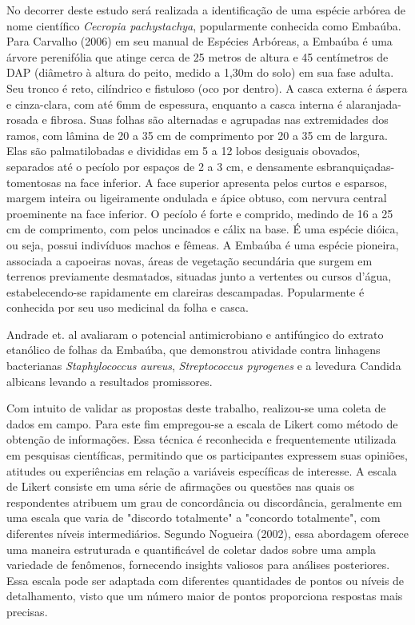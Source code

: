 No decorrer deste estudo será realizada a identificação de uma espécie arbórea de nome científico \textit{Cecropia pachystachya}, popularmente conhecida como Embaúba. Para Carvalho (2006) em seu manual de Espécies Arbóreas, a Embaúba é uma árvore perenifólia que atinge cerca de 25 metros de altura e 45 centímetros de DAP (diâmetro à altura do peito, medido a 1,30m do solo) em sua fase adulta. Seu tronco é reto, cilíndrico e fistuloso (oco por dentro). A casca externa é áspera e cinza-clara, com até 6mm de espessura, enquanto a casca interna é alaranjada-rosada e fibrosa. Suas folhas são alternadas e agrupadas nas extremidades dos ramos, com lâmina de 20 a 35 cm de comprimento por 20 a 35 cm de largura. Elas são palmatilobadas e divididas em 5 a 12 lobos desiguais obovados, separados até o pecíolo por espaços de 2 a 3 cm, e densamente esbranquiçadas-tomentosas na face inferior. A face superior apresenta pelos curtos e esparsos, margem inteira ou ligeiramente ondulada e ápice obtuso, com nervura central proeminente na face inferior. O pecíolo é forte e comprido, medindo de 16 a 25 cm de comprimento, com pelos uncinados e cálix na base. É uma espécie dióica, ou seja, possui indivíduos machos e fêmeas.\cite{carvalho2006embauba}
A Embaúba é uma espécie pioneira, associada a capoeiras novas, áreas de vegetação secundária que surgem em terrenos previamente desmatados, situadas junto a vertentes ou cursos d'água, estabelecendo-se rapidamente em clareiras descampadas. Popularmente é conhecida por seu uso medicinal da folha e casca. \cite{carvalho2006embauba}

Andrade et. al avaliaram o potencial antimicrobiano e antifúngico do extrato etanólico de folhas da Embaúba, que demonstrou atividade contra linhagens bacterianas \textit {Staphylococcus aureus}, \textit {Streptococcus pyrogenes} e a levedura Candida albicans levando a resultados promissores.\cite{de2021avaliaccao}

Com intuito de validar as propostas deste trabalho, realizou-se uma coleta de dados em campo. Para este fim empregou-se a escala de Likert como método de obtenção de informações. Essa técnica é reconhecida e frequentemente utilizada em pesquisas científicas, permitindo que os participantes expressem suas opiniões, atitudes ou experiências em relação a variáveis específicas de interesse. A escala de Likert consiste em uma série de afirmações ou questões nas quais os respondentes atribuem um grau de concordância ou discordância, geralmente em uma escala que varia de "discordo totalmente" a "concordo totalmente", com diferentes níveis intermediários.  Segundo Nogueira (2002), essa abordagem oferece uma maneira estruturada e quantificável de coletar dados sobre uma ampla variedade de fenômenos, fornecendo insights valiosos para análises posteriores. Essa escala pode ser adaptada com diferentes quantidades de pontos ou níveis de detalhamento, visto que um número maior de pontos proporciona respostas mais precisas.

